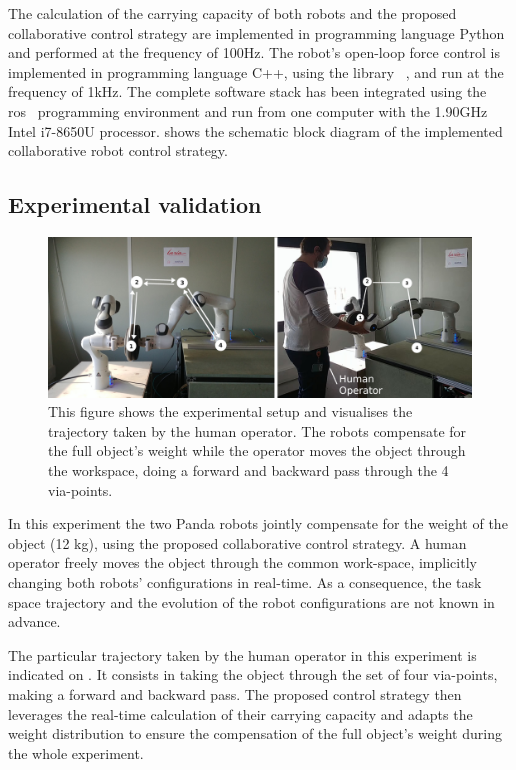 The calculation of the carrying capacity of both robots and the proposed collaborative control strategy are implemented in programming language Python and performed at the frequency of 100Hz.  The robot's open-loop force control is implemented in programming language C++, using the library ~\cite{pinocchio2021}, and run at the frequency of 1kHz. The complete software stack has been integrated using the \gls{ros}~\cite{ros} programming environment and run from one computer with the 1.90GHz Intel i7-8650U processor. 
 shows the schematic block diagram of the implemented collaborative robot control strategy. 

\subsection{Experimental validation}
\label{sec:experiment_dual_robto_carrying}
\begin{figure}[!h]
    \centering
    \includegraphics[width=\linewidth]{Papers/images/exp1_explication.jpg}
    \caption{This figure shows the experimental setup and visualises the trajectory taken by the human operator. The robots compensate for the full object's weight while the operator moves the object through the workspace, doing a forward and backward pass through the 4 via-points.}
    \label{fig:experiment1}
\end{figure}

In this experiment the two Panda robots jointly compensate for the weight of the object (12 kg), using the proposed collaborative control strategy. A human operator freely moves the object through the common work-space, implicitly changing both robots' configurations in real-time. As a consequence, the task space trajectory and the evolution of the robot configurations are not known in advance. 

The particular trajectory taken by the human operator in this experiment is indicated on . It consists in taking the object through the set of four via-points, making a forward and backward pass. The proposed control strategy then leverages the real-time calculation of their carrying capacity and adapts the weight distribution to ensure the compensation of the full object's weight during the whole experiment. 


